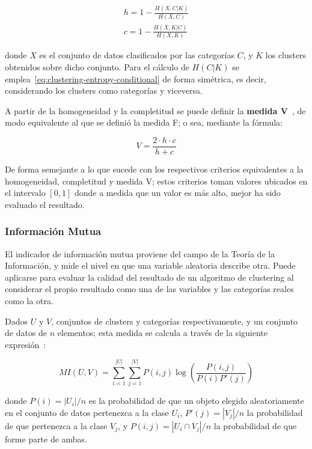 \begin{gather}
    h = 1 - \frac{H(X, C|K)}{H(X, C)} \\
    c = 1 - \frac{H(X, K|C)}{H(X, K)}
\end{gather}

\noindent
donde $X$ es el conjunto de datos clasificados por las categorías $C$, y $K$ los clusters obtenidos sobre dicho conjunto.
Para el cálculo de $H(C|K)$ se emplea~\ref{eq:clustering-entropy-conditional} de forma simétrica, es decir, considerando los clusters como categorías y viceversa.

A partir de la homogeneidad y la completitud se puede definir la \textbf{medida V}~\cite{Rosenberg07}, de modo equivalente al que se definió la medida F;
o sea, mediante la fórmula:

\begin{equation}
    \label{eq:V-measure}
    V = \frac{2 \cdot h \cdot c}{h + c}
\end{equation}

De forma semejante a lo que sucede con los respectivos criterios equivalentes a la homogeneidad, completitud y medida V;
estos criterios toman valores ubicados en el intervalo $[0,1]$ donde a medida que un valor es más alto, mejor ha sido evaluado el resultado.

\subsubsection{Información Mutua}

El indicador de información mutua proviene del campo de la Teoría de la Información, y mide el nivel en que una variable aleatoria describe otra.
Puede aplicarse para evaluar la calidad del resultado de un algoritmo de clustering al considerar el propio resultado como una de las variables y las categorías reales como la otra.

Dados $U$ y $V$, conjuntos de clusters y categorías respectivamente, y un conjunto de datos de $n$ elementos;
esta medida se calcula a través de la siguiente expresión~\cite{Aggarawal13,Vinh10}:

\begin{equation}
    \label{eq:mutual-information}
    MI(U,V) = \sum_{i=1}^{|U|}\sum_{j=1}^{|V|}{P(i,j)\log{\left( \frac{P(i,j)}{P(i)P'(j)} \right)}}
\end{equation}

\noindent
donde $P(i) = |U_i|/n$ es la probabilidad de que un objeto elegido aleatoriamente en el conjunto de datos pertenezca a la clase $U_i$, $P'(j) = |V_j|/n$ la probabilidad de que pertenezca a la clase $V_j$, y $P(i,j) = |U_i \cap V_j|/n$ la probabilidad de que forme parte de ambas.


